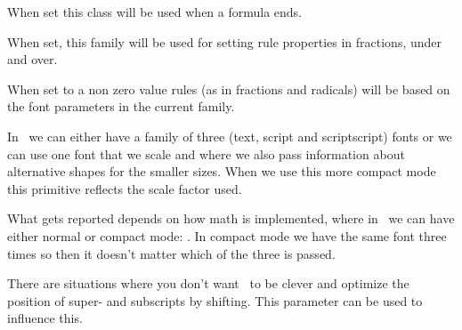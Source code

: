 \stopoldprimitive

\startnewprimitive[title={\prm {mathrightclass}}]

When set this class will be used when a formula ends.

\stopnewprimitive

\startnewprimitive[title={\prm {mathrulesfam}}]

When set, this family will be used for setting rule properties in fractions,
under and over.

\stopnewprimitive

\startnewprimitive[title={\prm {mathrulesmode}}]

When set to a non zero value rules (as in fractions and radicals) will be based
on the font parameters in the current family.

\stopnewprimitive

\startnewprimitive[title={\prm {mathscale}}]

In \LUAMETATEX\ we can either have a family of three (text, script and
scriptscript) fonts or we can use one font that we scale and where we also pass
information about alternative shapes for the smaller sizes. When we use this
more compact mode this primitive reflects the scale factor used.

\startbuffer
\im {
    \textstyle        \the\mathscale\textfont        \fam\enspace
    \scriptstyle      \the\mathscale\scriptfont      \fam\enspace
    \scriptscriptstyle\the\mathscale\scriptscriptfont\fam\enspace
    \textstyle        \the\mathscale\textfont        \fam\enspace
    \scriptstyle      \the\mathscale\textfont        \fam\enspace
    \scriptscriptstyle\the\mathscale\textfont        \fam

}
\stopbuffer

What gets reported depends on how math is implemented, where in \CONTEXT\ we can
have either normal or compact mode: \inlinebuffer. In compact mode we have the
same font three times so then it doesn't matter which of the three is passed.

\stopnewprimitive

\startnewprimitive[title={\prm {mathscriptsmode}}]

There are situations where you don't want \TEX\ to be clever and optimize the
position of super- and subscripts by shifting. This parameter can be used to
influence this.

